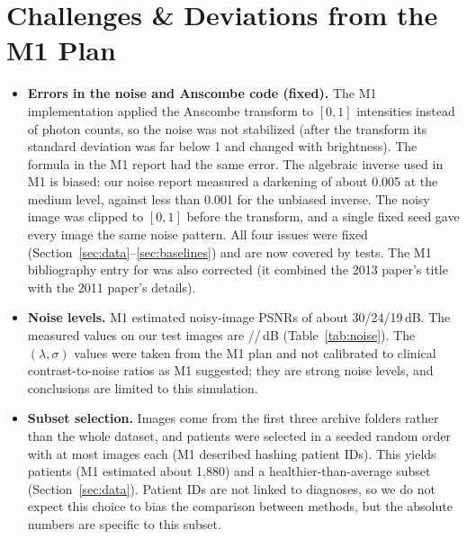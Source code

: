 \documentclass[11pt]{article}
\begin{document}
\begin{table}[htbp]
\centering
\caption{The frozen classifier on noisy test images without denoising, per noise level.}
\label{tab:judgelevels}

\end{table}

\section{Challenges \& Deviations from the M1 Plan}
\label{sec:challenges}
\begin{itemize}[leftmargin=*]
  \item \textbf{Errors in the noise and Anscombe code (fixed).} The M1 implementation applied the Anscombe transform to $[0,1]$ intensities instead of photon counts, so the noise was not stabilized (after the transform its standard deviation was far below 1 and changed with brightness). The formula in the M1 report had the same error. The algebraic inverse used in M1 is biased: our noise report measured a darkening of about 0.005 at the medium level, against less than 0.001 for the unbiased inverse. The noisy image was clipped to $[0,1]$ before the transform, and a single fixed seed gave every image the same noise pattern. All four issues were fixed (Section~\ref{sec:data}--\ref{sec:baselines}) and are now covered by tests. The M1 bibliography entry for \citet{makitalo2013gat} was also corrected (it combined the 2013 paper's title with the 2011 paper's details).
  \item \textbf{Noise levels.} M1 estimated noisy-image PSNRs of about 30/24/19\,dB. The measured values on our test images are \NoiseLowPSNR/\NoiseMediumPSNR/\NoiseHighPSNR\,dB (Table~\ref{tab:noise}). The $(\lambda,\sigma)$ values were taken from the M1 plan and not calibrated to clinical contrast-to-noise ratios as M1 suggested; they are strong noise levels, and conclusions are limited to this simulation.
  \item \textbf{Subset selection.} Images come from the first three archive folders rather than the whole dataset, and patients were selected in a seeded random order with at most \MaxPerPatient{} images each (M1 described hashing patient IDs). This yields \NPatients{} patients (M1 estimated about 1{,}880) and a healthier-than-average subset (Section~\ref{sec:data}). Patient IDs are not linked to diagnoses, so we do not expect this choice to bias the comparison between methods, but the absolute numbers are specific to this subset.

\end{itemize}
\end{document}
